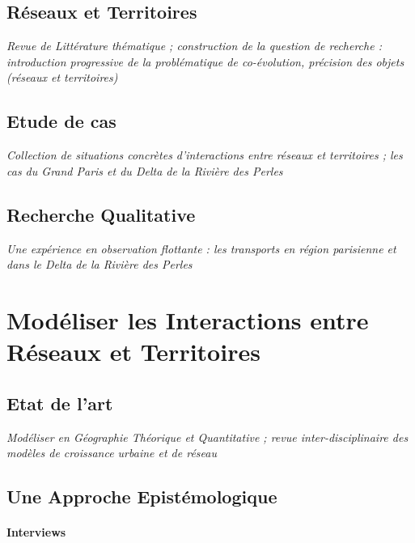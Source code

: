 \subsection{Réseaux et Territoires}

\textit{Revue de Littérature thématique ; construction de la question de recherche : introduction progressive de la problématique de co-évolution, précision des objets (réseaux et territoires)}


\subsection{Etude de cas}

\textit{Collection de situations concrètes d'interactions entre réseaux et territoires ; les cas du Grand Paris et du Delta de la Rivière des Perles} 


\subsection{Recherche Qualitative}

\textit{Une expérience en observation flottante : les transports en région parisienne et dans le Delta de la Rivière des Perles}



\section{Modéliser les Interactions entre Réseaux et Territoires}


\subsection{Etat de l'art}

\textit{Modéliser en Géographie Théorique et Quantitative ; revue inter-disciplinaire des modèles de croissance urbaine et de réseau}


\subsection{Une Approche Epistémologique}

\paragraph{Interviews} 

